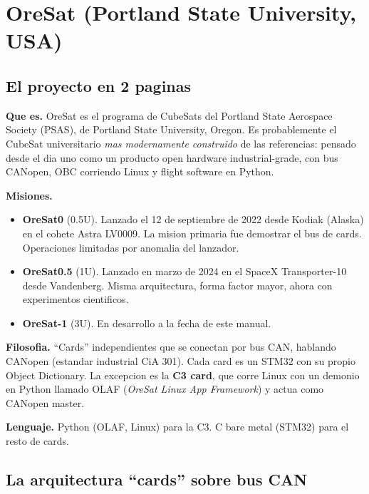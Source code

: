 \documentclass[11pt,a4paper,oneside,openright]{book}
\begin{document}
\chapter{OreSat (Portland State University, USA)}

\section{El proyecto en 2 paginas}

\textbf{Que es.} OreSat es el programa de CubeSats del Portland State
Aerospace Society (PSAS), de Portland State University, Oregon. Es
probablemente el CubeSat universitario \emph{mas modernamente
construido} de las referencias: pensado desde el dia uno como un
producto open hardware industrial-grade, con bus CANopen, OBC
corriendo Linux y flight software en Python.

\textbf{Misiones.}
\begin{itemize}[leftmargin=2em]
  \item \textbf{OreSat0} (0.5U). Lanzado el 12 de septiembre de 2022
    desde Kodiak (Alaska) en el cohete Astra LV0009. La mision
    primaria fue demostrar el bus de cards. Operaciones limitadas
    por anomalia del lanzador.
  \item \textbf{OreSat0.5} (1U). Lanzado en marzo de 2024 en el
    SpaceX Transporter-10 desde Vandenberg. Misma arquitectura,
    forma factor mayor, ahora con experimentos cientificos.
  \item \textbf{OreSat-1} (3U). En desarrollo a la fecha de este
    manual.
\end{itemize}

\textbf{Filosofia.} ``Cards'' independientes que se conectan por bus
CAN, hablando CANopen (estandar industrial CiA 301). Cada card es
un STM32 con su propio Object Dictionary. La excepcion es la \textbf{C3
card}, que corre Linux con un demonio en Python llamado OLAF
(\emph{OreSat Linux App Framework}) y actua como CANopen master.

\textbf{Lenguaje.} Python (OLAF, Linux) para la C3. C bare metal
(STM32) para el resto de cards.

\section{La arquitectura ``cards'' sobre bus CAN}
\end{document}
